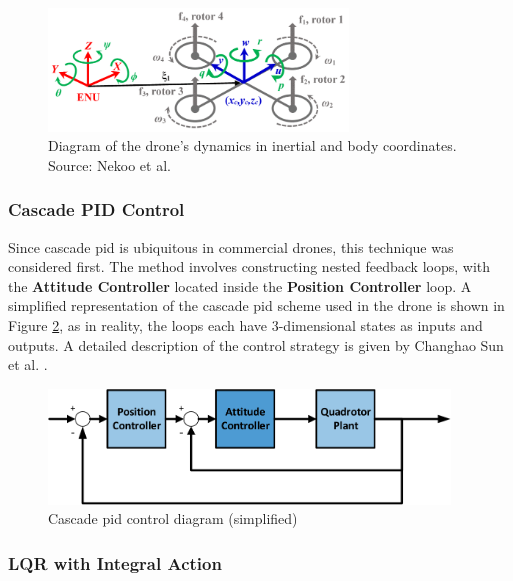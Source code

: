\begin{figure}[H]
\centering
\includegraphics[width=0.71\textwidth]{figs/Samuel/Figures/nekoo1-0005-large.png}
\caption[Diagram of the drone's dynamics in inertial and body coordinates]{Diagram of the drone's dynamics in inertial and body coordinates. Source: Nekoo et al. \cite{nekoo}}
\label{fig:nekoodiag}
\end{figure}

\subsubsection{Cascade PID Control}
Since cascade \gls{pid} is ubiquitous in commercial drones, this technique was considered first. The method involves constructing nested feedback loops, with the \textbf{Attitude Controller} located inside the \textbf{Position Controller} loop. A simplified representation of the cascade \gls{pid} scheme used in the drone is shown in Figure \ref{fig:pidloop}, as in reality, the loops each have 3-dimensional states as inputs and outputs. A detailed description of the control strategy is given by Changhao Sun et al. \cite{electronics10040376}.

\begin{figure}[H]
\centering
\includegraphics[width=0.95\textwidth]{figs/Samuel/Figures/Control Loop-cropped.pdf}
\caption{Cascade \gls{pid} control diagram (simplified)}
\label{fig:pidloop}
\end{figure}




\subsubsection{LQR with Integral Action}
\label{sec:symbs}

